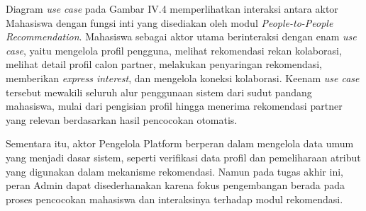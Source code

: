 Diagram \textit{use case} pada Gambar IV.4 memperlihatkan interaksi antara aktor Mahasiswa dengan fungsi inti yang disediakan oleh modul \textit{People-to-People Recommendation}. Mahasiswa sebagai aktor utama berinteraksi dengan enam \textit{use case}, yaitu mengelola profil pengguna, melihat rekomendasi rekan kolaborasi, melihat detail profil calon partner, melakukan penyaringan rekomendasi, memberikan \textit{express interest}, dan mengelola koneksi kolaborasi. Keenam \textit{use case} tersebut mewakili seluruh alur penggunaan sistem dari sudut pandang mahasiswa, mulai dari pengisian profil hingga menerima rekomendasi partner yang relevan berdasarkan hasil pencocokan otomatis.

Sementara itu, aktor Pengelola Platform berperan dalam mengelola data umum yang menjadi dasar sistem, seperti verifikasi data profil dan pemeliharaan atribut yang digunakan dalam mekanisme rekomendasi. Namun pada tugas akhir ini, peran Admin dapat disederhanakan karena fokus pengembangan berada pada proses pencocokan mahasiswa dan interaksinya terhadap modul rekomendasi.